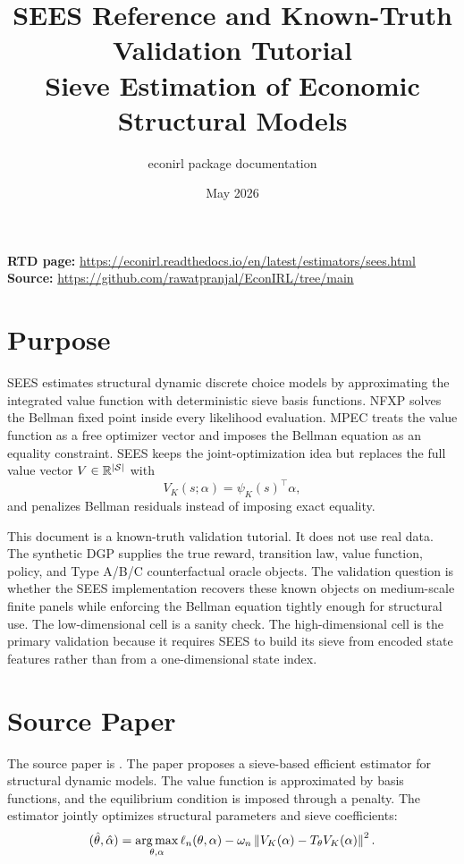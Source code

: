 \documentclass[10pt]{article}
\title{SEES Reference and Known-Truth Validation Tutorial\\[3pt]
\large Sieve Estimation of Economic Structural Models}
\author{econirl package documentation}
\date{May 2026}
\begin{document}
\maketitle

\begin{center}
\small
\textbf{RTD page:}
\url{https://econirl.readthedocs.io/en/latest/estimators/sees.html}
\quad
\textbf{Source:}
\url{https://github.com/rawatpranjal/EconIRL/tree/main}
\end{center}

\section{Purpose}

SEES estimates structural dynamic discrete choice models by approximating the
integrated value function with deterministic sieve basis functions. NFXP solves
the Bellman fixed point inside every likelihood evaluation. MPEC treats the
value function as a free optimizer vector and imposes the Bellman equation as
an equality constraint. SEES keeps the joint-optimization idea but replaces the
full value vector \(V\in\mathbb R^{|\mathcal{S}|}\) with
\[
V_K(s;\alpha) = \psi_K(s)^\top \alpha,
\]
and penalizes Bellman residuals instead of imposing exact equality.

This document is a known-truth validation tutorial. It does not use real data.
The synthetic DGP supplies the true reward, transition law, value function,
policy, and Type A/B/C counterfactual oracle objects. The validation question
is whether the SEES implementation recovers these known objects on
medium-scale finite panels while enforcing the Bellman equation tightly enough
for structural use. The low-dimensional cell is a sanity check. The
high-dimensional cell is the primary validation because it requires SEES to
build its sieve from encoded state features rather than from a one-dimensional
state index.

\section{Source Paper}

The source paper is \citet{luoSang2024}. The paper proposes a sieve-based
efficient estimator for structural dynamic models. The value function is
approximated by basis functions, and the equilibrium condition is imposed
through a penalty. The estimator jointly optimizes structural parameters and
sieve coefficients:
\[
(\hat\theta,\hat\alpha)
=
\operatorname*{arg\,max}_{\theta,\alpha}
\ell_n(\theta,\alpha)
-
\omega_n
\left\|V_K(\alpha)-T_\theta V_K(\alpha)\right\|^2.
\]
\end{document}

